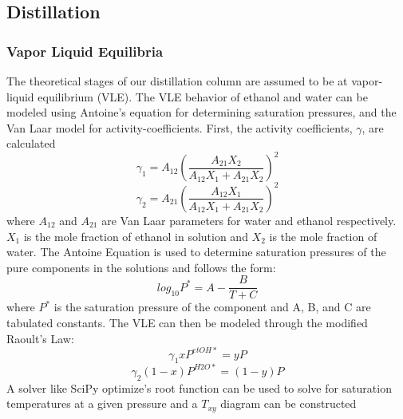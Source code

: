 \documentclass[lettersize,journal]{IEEEtran}
\begin{document}
	\subsection{Distillation}
	\subsubsection{Vapor Liquid Equilibria}
	The theoretical stages of our distillation column are assumed to be at vapor-liquid equilibrium (VLE). The VLE behavior of ethanol and water can be modeled using Antoine's equation for determining saturation pressures, and the Van Laar model for activity-coefficients.
	First, the activity coefficients, $\gamma$, are calculated
	\begin{equation}
		\label{deqn_ex5.5}
		\gamma_{1} = A_{12}(\frac{A_{21}X_{2}}{A_{12}X_{1}+A_{21}X_{2}})^{2}
	\end{equation}
	\begin{equation}
		\label{deqn_ex5.5}
		\gamma_{2} = A_{21}(\frac{A_{12}X_{1}}{A_{12}X_{1}+A_{21}X_{2}})^{2}
	\end{equation}
	where $A_{12}$ and $A_{21}$ are Van Laar parameters for water and ethanol respectively. $X_{1}$ is the mole fraction of ethanol in solution and $X_{2}$ is the mole fraction of water.
	The Antoine Equation is used to determine saturation pressures of the pure components in the solutions and follows the form:
	\begin{equation}
		\label{deqn_ex5.5}
		log_{10}P^{*} = A - \frac{B}{T+C}
	\end{equation}
	where $P^{*}$ is the saturation pressure of the component and A, B, and C are tabulated constants.
	The VLE can then be modeled through the modified Raoult's Law:
	\begin{equation}
		\label{deqn_ex5.5}
		\gamma_{1}xP^{etOH*} = yP
	\end{equation}
	\begin{equation}
		\label{deqn_ex5.5}
		\gamma_{2}(1-x)P^{H2O*} = (1-y)P
	\end{equation}
	A solver like SciPy optimize's root function can be used to solve for saturation temperatures at a given pressure and a $T_{xy}$ diagram can be constructed
\end{document}
